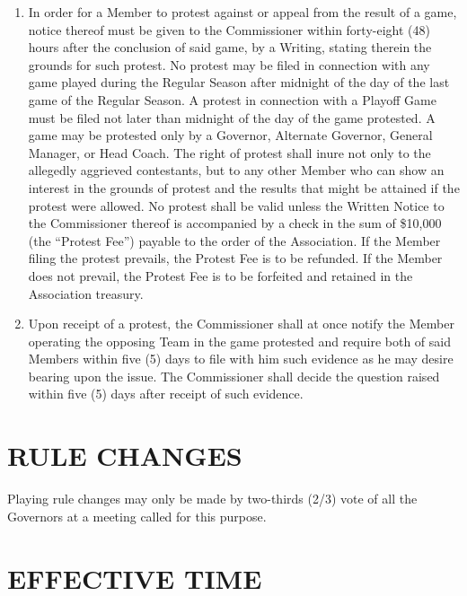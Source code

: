 \documentclass[]{book}
\providecommand{\tightlist}{%
  \setlength{\itemsep}{0pt}\setlength{\parskip}{0pt}}
\begin{document}
\begin{enumerate}
\def\labelenumi{(\alph{enumi})}
\tightlist
\item
  In order for a Member to protest against or appeal from the result of a game, notice thereof must be given to the Commissioner within forty-eight (48) hours after the conclusion of said game, by a Writing, stating therein the grounds for such protest. No protest may be filed in connection with any game played during the Regular Season after midnight of the day of the last game of the Regular Season. A protest in connection with a Playoff Game must be filed not later than midnight of the day of the game protested. A game may be protested only by a Governor, Alternate Governor, General Manager, or Head Coach. The right of protest shall inure not only to the allegedly aggrieved contestants, but to any other Member who can show an interest in the grounds of protest and the results that might be attained if the protest were allowed. No protest shall be valid unless the Written Notice to the Commissioner thereof is accompanied by a check in the sum of \$10,000 (the ``Protest Fee'') payable to the order of the Association. If the Member filing the protest prevails, the Protest Fee is to be refunded. If the Member does not prevail, the Protest Fee is to be forfeited and retained in the Association treasury.
\item
  Upon receipt of a protest, the Commissioner shall at once notify the Member operating the opposing Team in the game protested and require both of said Members within five (5) days to file with him such evidence as he may desire bearing upon the issue. The Commissioner shall decide the question raised within five (5) days after receipt of such evidence.
\end{enumerate}

\hypertarget{rule-changes}{%
\section{RULE CHANGES}\label{rule-changes}}

Playing rule changes may only be made by two-thirds (2/3) vote of all the Governors at a meeting called for this purpose.

\hypertarget{effective-time}{%
\section{EFFECTIVE TIME}\label{effective-time}}
\end{document}
